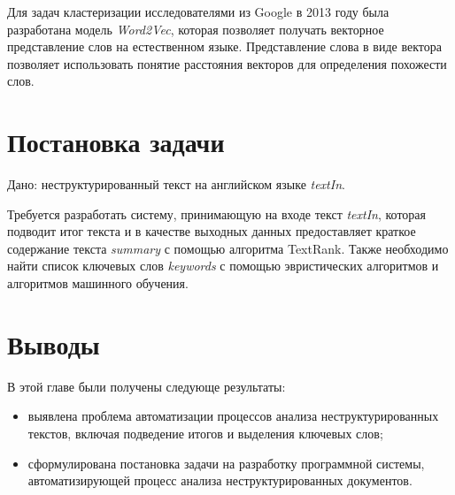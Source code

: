 Для задач кластеризации исследователями из Google в 2013 году была разработана модель \textit{Word2Vec}, которая позволяет получать векторное представление слов на естественном языке. Представление слова в виде вектора позволяет использовать понятие расстояния векторов для определения похожести слов.

\section{Постановка задачи}

Дано: неструктурированный текст на английском языке \textit{textIn}.

Требуется разработать систему, принимающую на входе текст \textit{textIn}, которая подводит итог текста и в качестве выходных данных предоставляет краткое содержание текста \textit{summary} с помощью алгоритма TextRank. Также необходимо найти список ключевых слов \textit{keywords} с помощью эвристических алгоритмов и алгоритмов машинного обучения.

\section{Выводы}

В этой главе были получены следующе результаты:
\begin{itemize}
    \item выявлена проблема автоматизации процессов анализа неструктурированных текстов, включая подведение итогов и выделения ключевых слов;
    \item сформулирована постановка задачи на разработку программной системы, автоматизирующей процесс анализа неструктурированных документов.
\end{itemize}
\newpage

